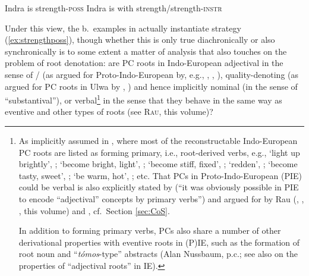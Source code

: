 \documentclass[output=paper,colorlinks,citecolor=brown]{langscibook}
\begin{document}
\begin{exe}
    \ex \label{ex:posspred}\begin{xlist}
        \ex Indra is strength-\textsc{poss} \label{ex:strengthposs}
        \ex Indra is with strength/strength-\textsc{instr}  \label{ex:strengthinstr}
    \end{xlist}
\end{exe}


Under this view, the b.\ examples in  actually instantiate strategy (\ref{ex:strengthposs}), though whether this is only true diachronically or also synchronically is to some extent a matter of analysis that also touches on the problem of root denotation: are PC roots in Indo-European adjectival  in the sense of / (as argued for Proto-Indo-European by, e.g., \citealt{Nussbaum1976}, \citeyear{Nussbaum2021}, \citeyear{Nussbaum2022}), quality-denoting (as argued for PC roots in Ulwa by \citealt{KoontzFrancez2010}, \citealt{FrancezKoontz2017}) and hence implicitly nominal (in the sense of ``substantival''), or verbal\footnote{\label{fn:verbalroot}As implicitly assumed in , where most of the reconstructable Indo-European PC roots are listed as forming primary, i.e., root-derived verbs, e.g.,  `light up brightly', ;   `become bright, light', ;  `become stiff, fixed', ;  `redden', ;   `become tasty, sweet', ;   `be warm, hot', ; etc. That PCs in Proto-Indo-European (PIE) could be verbal is also explicitly stated by \citet[8]{Balles2009} (``it was obviously possible in PIE to encode ``adjectival'' concepts by primary verbs'')  and argued for by Rau (\citeyear{Rau2009}, \citeyear{Rau2013}, \citeyear{Rau2016}, this volume) and \citet{Bozzone2016}, cf.\  Section \ref{sec:CoS}.

In addition to forming primary verbs,  PCs also share a number of other derivational properties with eventive roots in (P)IE, such as the formation of root noun and ``\textit{tómos}-type'' abstracts (Alan Nussbaum, p.c.; see also \citealt{Nussbaum2022} on the properties of ``adjectival roots'' in IE).} in the sense that they behave in the same way as eventive and other types of  roots (see \textsc{Rau}, this volume)?
\end{document}
